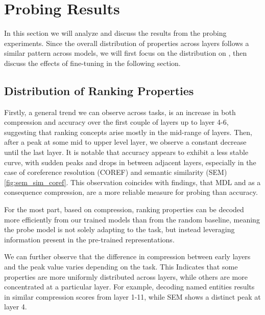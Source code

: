\chapter{Probing Results}
\label{chap:results}
In this section we will analyze and discuss the results from the probing experiments. Since the overall distribution of properties across layers follows a similar pattern across models, we will first focus on the distribution on , then discuss the effects of fine-tuning in the following section.

\section{Distribution of Ranking Properties}
Firstly, a general trend we can observe across tasks, is an increase in both compression and accuracy over the first couple of layers up to layer 4-6, suggesting that ranking concepts arise mostly in the mid-range of layers. Then, after a peak at some mid to upper level layer, we observe a constant decrease until the last layer. It is notable that accuracy appears to exhibit a less stable curve, with sudden peaks and drops in between adjacent layers, especially in the case of coreference resolution (COREF) and semantic similarity (SEM) \autoref{fig:sem_sim_coref}. This observation coincides with \cite{voita-titov-2020-information} findings, that MDL and as a consequence compression, are a more reliable measure for probing than accuracy.

For the most part, based on compression, ranking properties can be decoded more efficiently from our trained models than from the random baseline, meaning the probe model is not solely adapting to the task, but instead leveraging information present in the pre-trained representations.

We can further observe that the difference in compression between early layers and the peak value varies depending on the task. This Indicates that some properties are more uniformly distributed across layers, while others are more concentrated at a particular layer. For example, decoding named entities results in similar compression scores from layer 1-11, while SEM shows a distinct peak at layer 4.

